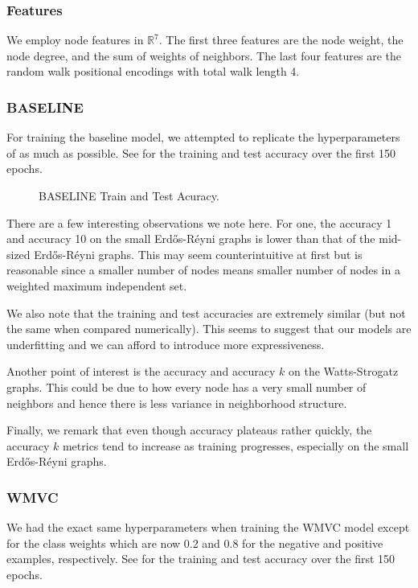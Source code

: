 \documentclass{article}
\newcommand{\R}{\mathbb{R}}
\begin{document}
\subsubsection{Features}
We employ node features in $\R^7$.
The first three features are the node weight,
the node degree,
and the sum of weights of neighbors.
The last four features are the random walk positional encodings
with total walk length 4.

\subsubsection{BASELINE}
For training the baseline model,
we attempted to replicate the hyperparameters of \citet{langedal_et_al}
as much as possible.
See  for the training and test accuracy over the first 150 epochs.

\begin{figure}
     \centering
     \caption{BASELINE Train and Test Acuracy.}
     \label{fig:baseline_test}
\end{figure}

There are a few interesting observations we note here.
For one,
the accuracy 1 and accuracy 10 on the small Erd\H os-R\'eyni graphs
is lower than that of the mid-sized Erd\H os-R\'eyni graphs.
This may seem counterintuitive at first
but is reasonable since a smaller number of nodes means smaller number of nodes in a weighted maximum independent set.

We also note that the training and test accuracies are extremely similar
(but not the same when compared numerically).
This seems to suggest that our models are underfitting
and we can afford to introduce more expressiveness.

Another point of interest is the accuracy and accuracy $k$ on the Watts-Strogatz graphs.
This could be due to how every node has a very small number of neighbors
and hence there is less variance in neighborhood structure.

Finally,
we remark that even though accuracy plateaus rather quickly,
the accuracy $k$ metrics tend to increase as training progresses,
especially on the small Erd\H os-R\'eyni graphs.

\subsubsection{WMVC}
We had the exact same hyperparameters
when training the WMVC model
except for the class weights which are now 0.2 and 0.8
for the negative and positive examples,
respectively.
See  for the training and test accuracy over the first 150 epochs.
\end{document}
